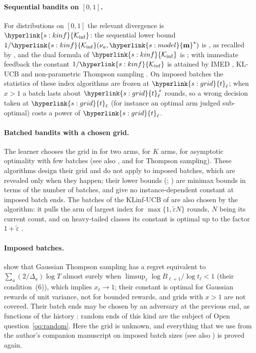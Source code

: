 \documentclass[10pt]{article}
\newcommand{\sy}[2]{{\hyperlink{#1}{#2}}}
\newcommand{\1}{\mathbf{1}}
\newcommand{\m}{\sy{s:model}{\mathbf{m}}}
\newcommand{\Ki}{\sy{s:kinf}{\mathcal K_{\inf}}}
\newcommand{\tl}{\sy{s:grid}{t}}
\begin{document}
\paragraph{Sequential bandits on $[0,1]$.} For distributions on $[0,1]$ the relevant divergence is $\Ki$: the sequential lower bound $1/\Ki(\nu_a,\m^\star)$ is \citet[Proposition~1]{BK96}, as
recalled by \citet[(2)]{HT10}, and the dual formula of $\Ki$ is \citet[Theorem~8]{HT10}; with immediate feedback the constant
$1/\Ki$ is attained by IMED \citep{HT15}, KL-UCB \citep{CGMMS13,GHMS22} and non-parametric Thompson sampling \citep{RH20}. On imposed batches the statistics of these index
algorithms are frozen at $\tl_\ell$; when $x>1$ a batch lasts about $\tl_\ell^{\,x}$ rounds, so a wrong decision taken at $\tl_\ell$ (for instance an optimal arm judged
sub-optimal) costs a power of $\tl_\ell$.

\paragraph{Batched bandits with a chosen grid.} The learner chooses the grid in \citet{PRCS16} for two arms, \citet{GHRZ19} for $K$ arms, \citet{JTXHXG21} for asymptotic
optimality with few batches (see also \citealp{EKMM21,JXXG21}, and \citealp{KMS21} for Thompson sampling). These algorithms design their grid and do not apply to imposed
batches, which are revealed only when they happen; their lower bounds (\citealp[Theorem~4]{PRCS16}; \citealp[Section~3]{GHRZ19}) are minimax bounds in terms of the number of
batches, and give no instance-dependent constant at imposed batch ends. The batches of the KLinf-UCB of \citet[Section~3, Algorithm~1]{AJK21}
are also chosen by the algorithm: it pulls the arm of largest index for $\max\{1,\tilde\varepsilon N\}$ rounds, $N$ being its current count, and on heavy-tailed classes its
constant is optimal up to the factor $1+\tilde\varepsilon$ \citep[Theorem~1 and Corollary~2]{AJK21}.

\paragraph{Imposed batches.} \citet[Theorem~1]{KO21b} show that Gaussian Thompson sampling has a regret equivalent to
$\sum_a(2/\Delta_a)\log T$ almost surely when $\limsup_\ell\log B_{\ell+1}/\log t_\ell<1$ (their condition~(6)), which implies $x_\ell\to1$; their constant is optimal for
Gaussian rewards of unit variance, not for bounded rewards, and grids with $x>1$ are not covered. Their batch ends may be chosen by an adversary at the previous end, as
functions of the history \citep[Section~II.A]{KO21b}: random ends of this kind are the subject of Open question~\ref{oq:random}. Here the grid is unknown, and everything
that we use from the author's companion manuscript on imposed batch sizes (see also \citealp{P26}) is proved again.
\end{document}
